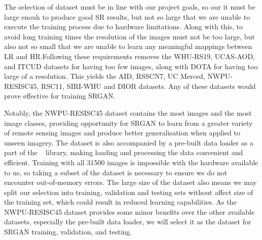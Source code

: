 The selection of dataset must be in line with our project goals, so our it must be large enouh to produce good SR results, but not so large that we are unable to execute the training process due to hardware limitations. Along with this, to avoid long training times the resolution of the images must not be too large, but also not so small that we are unable to learn any meaningful mappings between LR and HR.\@  Following these requirements removes the WHU-RS19, UCAS-AOD, and ITCUD datasets for having too few images, along with DOTA for having too large of a resolution. This yields the AID, RSSCN7, UC Merced, NWPU-RESISC45, RSC11, SIRI-WHU and DIOR datasets. Any of these datasets would prove effective for training SRGAN.

Notably, the NWPU-RESISC45 dataset contains the most images and the most image classes, providing opportunity for SRGAN to learn from a greater variety of remote sensing images and produce better generalisation when applied to unseen imagery. The dataset is also accompanied by a pre-built data loader as a part of the ~\cite{tensorflowDatasets}  library, making loading and processing the data convenient and efficient. Training with all 31500 images is impossible with the hardware available to us, so taking a subset of the dataset is necessary to ensure we do not encounter out-of-memory errors. The large size of the dataset also means we may split our selection into training, validation and testing sets without affect size of the training set, which could result in reduced learning capabilities. As the NWPU-RESISC45 dataset provides some minor benefits over the other available datasets, especially the pre-built data loader, we will select it as the dataset for SRGAN training, validation, and testing. 

